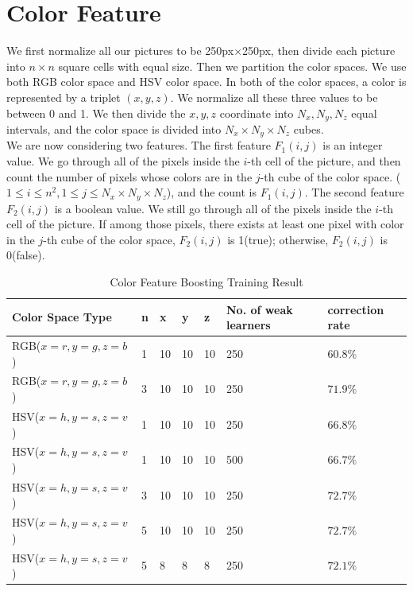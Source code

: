 \documentclass[12pt]{article}
\begin{document}
\section{Color Feature}
We first normalize all our pictures to be 250px$ \times $250px, then divide each picture into $n\times n$ square cells with equal size. Then we partition the color spaces. We use both RGB color space and HSV color space. In both of the color spaces, a color is represented by a triplet $(x,y,z)$. We normalize all these three values to be between 0 and 1. We then divide the $x,y,z$ coordinate into $N_x, N_y, N_z$ equal intervals, and the color space is divided into $N_x \times N_y \times N_z$ cubes. \\
We are now considering two features. The first feature $F_1(i, j)$ is an integer value. We go through all of the pixels inside the $i$-th cell of the picture, and then count the number of pixels whose colors are in the $j$-th cube of the color space. ($ 1 \leq i \leq n^2, 1 \leq j \leq N_x \times N_y \times N_z $), and the count is $F_1(i, j)$. The second feature $F_2(i, j)$ is a boolean value. We still go through all of the pixels inside the $i$-th cell of the picture. If among those pixels, there exists at least one pixel with color in the $j$-th cube of the color space, $F_2(i, j)$ is 1(true); otherwise, $F_2(i, j)$ is 0(false).\\
\begin{table}[h]
\caption{Color Feature Boosting Training Result}
\centering
\begin{tabular}{| l | l | l | l | l | l | l |}
\hline
Color Space Type & n & x & y & z & No. of weak learners & correction rate\\
\hline
RGB($x = r, y = g, z = b$) & 1 & 10 & 10 & 10 & 250 & $60.8 \%$\\
\hline
RGB($x = r, y = g, z = b$) & 3 & 10 & 10 & 10 & 250 & $71.9 \%$\\
\hline
HSV($x = h, y = s, z = v$) & 1 & 10 & 10 & 10 & 250 & $66.8 \%$\\
\hline
HSV($x = h, y = s, z = v$) & 1 & 10 & 10 & 10 & 500 & $66.7 \%$\\
\hline
HSV($x = h, y = s, z = v$) & 3 & 10 & 10 & 10 & 250 & $72.7 \%$\\
\hline
HSV($x = h, y = s, z = v$) & 5 & 10 & 10 & 10 & 250 & $72.7 \%$\\
\hline
HSV($x = h, y = s, z = v$) & 5 & 8 & 8 & 8 & 250 & $72.1 \%$\\
\hline
\end{tabular}
\end{table}
\end{document}
